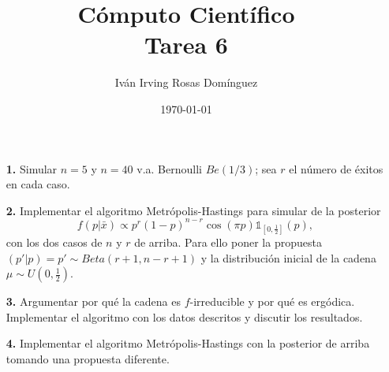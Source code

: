 \documentclass[letterpaper]{article}
\title{\textbf{Cómputo Científico\\
Tarea 6\\
}}
\author{Iván Irving Rosas Domínguez}
\date{\today}
\newcommand{\1}{\mathds{1}}
\theoremstyle{definition}
\theoremstyle{definition}
\theoremstyle{definition}
\theoremstyle{definition}
\theoremstyle{definition}
\begin{document}
\maketitle

\begin{enumerate}
    \item[\textbf{1.}] Simular $n=5$ y $n=40$ v.a. Bernoulli $Be(1/3)$; sea $r$ el número 
    de éxitos en cada caso.
    \item[\textbf{2.}] Implementar el algoritmo Metrópolis-Hastings para simular de 
    la posterior 
    \[
    f(p|\bar{x})\propto p^r(1-p)^{n-r}\cos(\pi p)\1_{[0,\frac{1}{2}]}(p),    
    \]
    con los dos casos de $n$ y $r$ de arriba. Para ello poner la propuesta $(p'|p)=p'\sim Beta(r+1,n-r+1)$
    y la distribución inicial de la cadena $\mu\sim U(0,\frac{1}{2})$.
    \item[\textbf{3.}] Argumentar por qué la cadena es $f$-irreducible y por qué es ergódica. 
    Implementar el algoritmo con los datos descritos y discutir los resultados.
    \item[\textbf{4.}] Implementar el algoritmo Metrópolis-Hastings con la posterior de arriba 
    tomando una propuesta diferente.
\end{enumerate}
\end{document}
